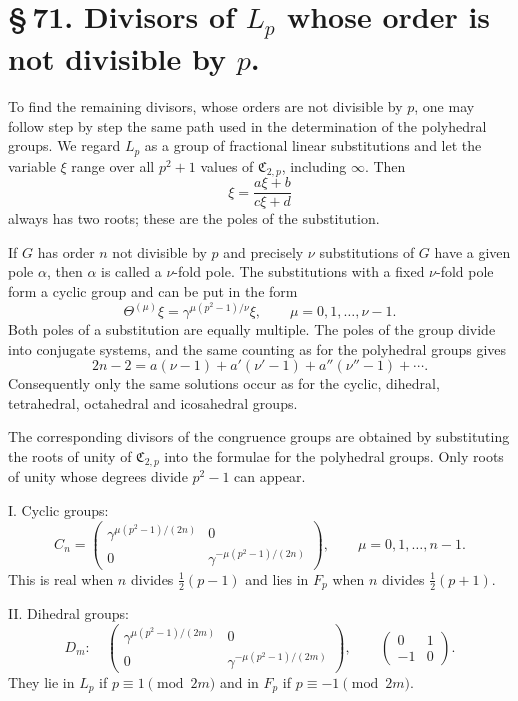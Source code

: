 \documentclass[11pt]{article}
\providecommand{\mat}[4]{\begin{pmatrix}#1&#2\\#3&#4\end{pmatrix}}
\providecommand{\mat}[4]{\begin{pmatrix}#1&#2\\#3&#4\end{pmatrix}}
\providecommand{\Cfield}{\mathfrak C}
\begin{document}
\section*{\S\,71. Divisors of $L_p$ whose order is not divisible by $p$.}

To find the remaining divisors, whose orders are not divisible by $p$, one may follow step by step the same path used in the determination of the polyhedral groups. We regard $L_p$ as a group of fractional linear substitutions and let the variable $\xi$ range over all $p^2+1$ values of $\Cfield_{2,p}$, including $\infty$. Then
\begin{equation}
 \xi=\frac{a\xi+b}{c\xi+d}
 \tag{1}
\end{equation}
always has two roots; these are the poles of the substitution.

If $G$ has order $n$ not divisible by $p$ and precisely $\nu$ substitutions of $G$ have a given pole $\alpha$, then $\alpha$ is called a $\nu$-fold pole. The substitutions with a fixed $\nu$-fold pole form a cyclic group and can be put in the form
\begin{equation}
 \Theta^{(\mu)}\xi=\gamma^{\mu(p^2-1)/\nu}\xi,
 \qquad \mu=0,1,
 \ldots,\nu-1.
 \tag{2}
\end{equation}
Both poles of a substitution are equally multiple. The poles of the group divide into conjugate systems, and the same counting as for the polyhedral groups gives
\begin{equation}
 2n-2=a(\nu-1)+a'(\nu'-1)+a''(\nu''-1)+\cdots.
 \tag{3}
\end{equation}
Consequently only the same solutions occur as for the cyclic, dihedral, tetrahedral, octahedral and icosahedral groups.

The corresponding divisors of the congruence groups are obtained by substituting the roots of unity of $\Cfield_{2,p}$ into the formulae for the polyhedral groups. Only roots of unity whose degrees divide $p^2-1$ can appear.

I. Cyclic groups:
\begin{equation}
 C_n=\mat{\gamma^{\mu(p^2-1)/(2n)}}{0}{0}{\gamma^{-\mu(p^2-1)/(2n)}},
 \qquad \mu=0,1,\ldots,n-1.
 \tag{4}
\end{equation}
This is real when $n$ divides $\frac12(p-1)$ and lies in $F_p$ when $n$ divides $\frac12(p+1)$.

II. Dihedral groups:
\begin{equation}
 D_m:\quad
 \mat{\gamma^{\mu(p^2-1)/(2m)}}{0}{0}{\gamma^{-\mu(p^2-1)/(2m)}},
 \qquad
 \mat{0}{1}{-1}{0}.
 \tag{5}
\end{equation}
They lie in $L_p$ if $p\equiv1\pmod {2m}$ and in $F_p$ if $p\equiv-1\pmod {2m}$.
\end{document}

